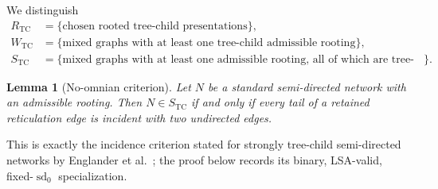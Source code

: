 \documentclass[11pt]{article}
\newtheorem{lemma}[theorem]{Lemma}
\theoremstyle{remark}
\newcommand{\TCr}{R_{\mathrm{TC}}}
\newcommand{\TCw}{W_{\mathrm{TC}}}
\newcommand{\TCs}{S_{\mathrm{TC}}}
\begin{document}
We distinguish
\[
\begin{aligned}
\TCr&=\{\text{chosen rooted tree-child presentations}\},\\
\TCw&=\{\text{mixed graphs with at least one tree-child admissible rooting}\},\\
\TCs&=\{\text{mixed graphs with at least one admissible rooting, all of
which are tree-child}\}.
\end{aligned}
\]

\begin{lemma}[No-omnian criterion]\label{lem:no-omnian}
Let $N$ be a standard semi-directed network with an admissible rooting.  Then
$N\in\TCs$ if and only if every tail of a retained reticulation edge is
incident with two undirected edges.
\end{lemma}

This is exactly the incidence criterion stated for strongly tree-child
semi-directed networks by Englander et
al.~\cite[Definition~2.3]{EnglanderEtAl2026}; the proof below records its
binary, LSA-valid, fixed-$\operatorname{sd}_0$ specialization.
\end{document}
